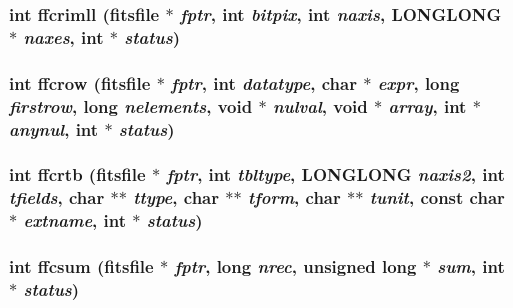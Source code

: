 \subsubsection{\setlength{\rightskip}{0pt plus 5cm}int ffcrimll (\bf{fitsfile} $\ast$ {\em fptr}, int {\em bitpix}, int {\em naxis}, \bf{LONGLONG} $\ast$ {\em naxes}, int $\ast$ {\em status})}\label{test_2roimasker_2fitsio_8h_1f63a696ea6ed4ca47c04c67264d23e3}


\subsubsection{\setlength{\rightskip}{0pt plus 5cm}int ffcrow (\bf{fitsfile} $\ast$ {\em fptr}, int {\em datatype}, char $\ast$ {\em expr}, long {\em firstrow}, long {\em nelements}, void $\ast$ {\em nulval}, void $\ast$ {\em array}, int $\ast$ {\em anynul}, int $\ast$ {\em status})}\label{test_2roimasker_2fitsio_8h_7460392e7c0487148565dc632faae6f9}


\subsubsection{\setlength{\rightskip}{0pt plus 5cm}int ffcrtb (\bf{fitsfile} $\ast$ {\em fptr}, int {\em tbltype}, \bf{LONGLONG} {\em naxis2}, int {\em tfields}, char $\ast$$\ast$ {\em ttype}, char $\ast$$\ast$ {\em tform}, char $\ast$$\ast$ {\em tunit}, const char $\ast$ {\em extname}, int $\ast$ {\em status})}\label{test_2roimasker_2fitsio_8h_9e0996d3514ac3a9395ffe53f47ae47c}


\subsubsection{\setlength{\rightskip}{0pt plus 5cm}int ffcsum (\bf{fitsfile} $\ast$ {\em fptr}, long {\em nrec}, unsigned long $\ast$ {\em sum}, int $\ast$ {\em status})}\label{test_2roimasker_2fitsio_8h_ed833bcd8507fea7a754cf607a386837}


